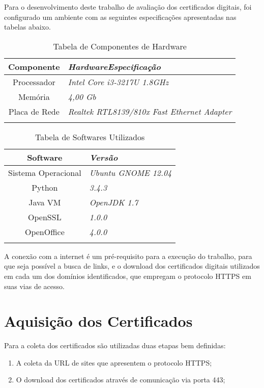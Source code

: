 		Para o desenvolvimento deste trabalho de avaliação dos certificados digitais, foi configurado um ambiente com as seguintes especificações apresentadas nas tabelas abaixo.
		\begin{center}
			\begin{longtable}{c>{\em}l}
			\toprule
			\textbf{Componente} & \textbf{Hardware\/Especificação} \\ \midrule
			Processador & Intel Core i3-3217U 1.8GHz \\ 
			\rowcolor[gray]{0.9}
			Memória & 4,00 Gb \\
			Placa de Rede & Realtek RTL8139/810x Fast Ethernet Adapter \\ 
			\bottomrule
			\caption{Tabela de Componentes de Hardware}
			\end{longtable}
		\end{center}
		\begin{center}
			\begin{longtable}{c>{\em}l}
			\toprule
			\textbf{Software} & \textbf{Versão} \\ \midrule
			Sistema Operacional & Ubuntu GNOME 12.04 \\ 
			\rowcolor[gray]{0.9}
			Python & 3.4.3 \\
			Java VM & OpenJDK 1.7 \\
			\rowcolor[gray]{0.9}
			OpenSSL & 1.0.0 \\
			OpenOffice & 4.0.0 \\
			\bottomrule
			\caption{Tabela de Softwares Utilizados}
			\end{longtable}
		\end{center}
		A conexão com a internet é um pré-requisito para a execução do trabalho, para que seja possível a busca de links, e o download dos certificados digitais utilizados em cada um dos domínios identificados, que empregam o protocolo HTTPS em suas vias de acesso. 
		
	\section[Aquisição dos Certificados]{Aquisição dos Certificados}
	
		Para a coleta dos certificados são utilizadas duas etapas bem definidas:
		
		\begin{enumerate}
			\item A coleta da URL de sites que apresentem o protocolo HTTPS;
			\item O download dos certificados através de comunicação via porta 443;
		\end{enumerate}

